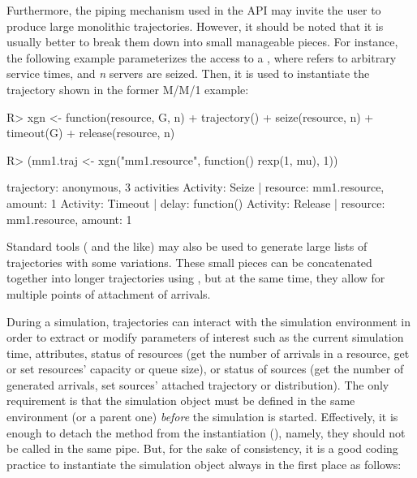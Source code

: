 \documentclass[
  nojss]{jss}
\begin{document}
Furthermore, the piping mechanism used in the  API may
invite the user to produce large monolithic trajectories. However, it
should be noted that it is usually better to break them down into small
manageable pieces. For instance, the following example parameterizes the
access to a , where  refers to arbitrary service
times, and \emph{n} servers are seized. Then, it is used to instantiate
the trajectory shown in the former M/M/1 example:

\begin{CodeChunk}
\begin{CodeInput}
R> xgn <- function(resource, G, n)
+   trajectory() %
+     seize(resource, n) %
+     timeout(G) %
+     release(resource, n)
\end{CodeInput}
\end{CodeChunk}

\begin{CodeChunk}
\begin{CodeInput}
R> (mm1.traj <- xgn("mm1.resource", function() rexp(1, mu), 1))
\end{CodeInput}
\begin{CodeOutput}
trajectory: anonymous, 3 activities
{ Activity: Seize        | resource: mm1.resource, amount: 1 }
{ Activity: Timeout      | delay: function() }
{ Activity: Release      | resource: mm1.resource, amount: 1 }
\end{CodeOutput}
\end{CodeChunk}

Standard  tools ( and the like) may also be
used to generate large lists of trajectories with some variations. These
small pieces can be concatenated together into longer trajectories using
, but at the same time, they allow for multiple points of
attachment of arrivals.

During a simulation, trajectories can interact with the simulation
environment in order to extract or modify parameters of interest such as
the current simulation time, attributes, status of resources (get the
number of arrivals in a resource, get or set resources' capacity or
queue size), or status of sources (get the number of generated arrivals,
set sources' attached trajectory or distribution). The only requirement
is that the simulation object must be defined in the same 
environment (or a parent one) \emph{before} the simulation is started.
Effectively, it is enough to detach the  method from the
instantiation (), namely, they should not be called in
the same pipe. But, for the sake of consistency, it is a good coding
practice to instantiate the simulation object always in the first place
as follows:
\end{document}
